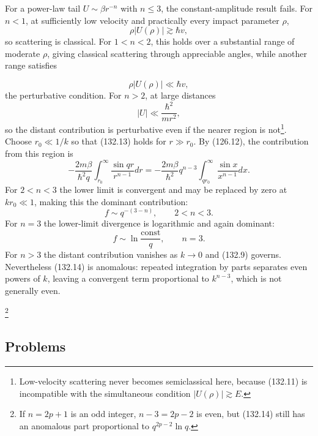 For a power-law tail $U\sim\beta r^{-n}$ with $n\leq3$, the constant-amplitude
result fails. For $n<1$, at sufficiently low velocity and practically every
impact parameter $\rho$,
\begin{equation}
 \rho|U(\rho)|\gtrsim\hbar v, \tag{132.11}
\end{equation}
so scattering is classical. For $1<n<2$, this holds over a substantial range
of moderate $\rho$, giving classical scattering through appreciable angles,
while another range satisfies

\begin{equation}
 \rho|U(\rho)|\ll\hbar v, \tag{132.12}
\end{equation}
the perturbative condition. For $n>2$, at large distances
\begin{equation}
 |U|\ll\frac{\hbar^2}{mr^2}, \tag{132.13}
\end{equation}
so the distant contribution is perturbative even if the nearer region is
not\footnote{Low-velocity scattering never becomes semiclassical here,
because (132.11) is incompatible with the simultaneous condition
$|U(\rho)|\gtrsim E$.}. Choose $r_0\ll1/k$ so that (132.13) holds for
$r\gg r_0$. By (126.12), the contribution from this region is
\begin{equation}
 -\frac{2m\beta}{\hbar^2q}\int_{r_0}^{\infty}\frac{\sin qr}{r^{n-1}}dr
 =-\frac{2m\beta}{\hbar^2}q^{n-3}
 \int_{qr_0}^{\infty}\frac{\sin x}{x^{n-1}}dx. \tag{132.14}
\end{equation}
For $2<n<3$ the lower limit is convergent and may be replaced by zero at
$kr_0\ll1$, making this the dominant contribution:
\begin{equation}
 f\sim q^{-(3-n)},\qquad2<n<3. \tag{132.15}
\end{equation}
For $n=3$ the lower-limit divergence is logarithmic and again dominant:
\begin{equation}
 f\sim\ln\frac{\mathrm{const}}q,\qquad n=3. \tag{132.16}
\end{equation}
For $n>3$ the distant contribution vanishes as $k\to0$ and (132.9) governs.
Nevertheless (132.14) is anomalous: repeated integration by parts separates
even powers of $k$, leaving a convergent term proportional to $k^{n-3}$,
which is not generally even.

\footnote{If $n=2p+1$ is an odd integer, $n-3=2p-2$ is even, but (132.14)
still has an anomalous part proportional to $q^{2p-2}\ln q$.}

\subsection*{Problems}

